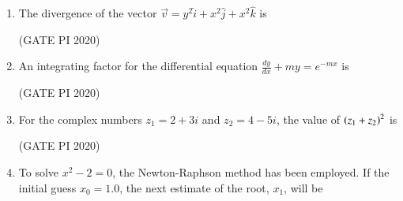 \documentclass[journal,12pt,onecolumn]{IEEEtran}
\theoremstyle{remark}
\begin{document}
\begin{enumerate}
    
\item The divergence of the vector $\vec{v} = y^2 \hat{i} + x^2 \hat{j} + x^2 \hat{k}$ is 
\begin{enumerate}
\end{enumerate}

\hfill (GATE PI 2020)

\item An integrating factor for the differential equation $\frac{dy}{dx} + my = e^{-mx}$ is 
\begin{enumerate}
\end{enumerate}

\hfill (GATE PI 2020)

\item For the complex numbers $z_1 = 2 + 3i$ and $z_2 = 4 - 5i$, the value of $\left(z_1 + z_2\right)^{2}$ is
\begin{enumerate}
\end{enumerate}

\hfill (GATE PI 2020)

\item To solve $x^{2} - 2 = 0$, the Newton-Raphson method has been employed. If the initial guess $x_0 = 1.0$, the next estimate of the root, $x_1$, will be
\begin{enumerate}
\end{enumerate}


\end{enumerate}
\end{document}
